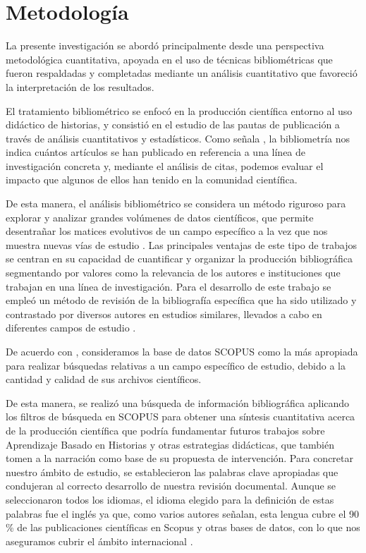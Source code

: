 \section{Metodología}\label{sec-metodología}

La presente investigación se abordó principalmente desde una perspectiva metodológica cuantitativa, apoyada en el uso de técnicas bibliométricas que fueron respaldadas y completadas mediante un análisis cuantitativo que favoreció la interpretación de los resultados.

El tratamiento bibliométrico se enfocó en la producción científica entorno al uso didáctico de historias, y consistió en el estudio de las pautas de publicación a través de análisis cuantitativos y estadísticos. Como señala \cite{mcburney2002what}, la bibliometría nos indica cuántos artículos se han publicado en referencia a una línea de investigación concreta y, mediante el análisis de citas, podemos evaluar el impacto que algunos de ellos han tenido en la comunidad científica.

De esta manera, el análisis bibliométrico se considera un método riguroso para explorar y analizar grandes volúmenes de datos científicos, que permite desentrañar los matices evolutivos de un campo específico a la vez que nos muestra nuevas vías de estudio \cite{donthu2021how}. Las principales ventajas de este tipo de trabajos se centran en su capacidad de cuantificar y organizar la producción bibliográfica segmentando por valores como la relevancia de los autores e instituciones que trabajan en una línea de investigación. Para el desarrollo de este trabajo se empleó un método de revisión de la bibliografía específica que ha sido utilizado y contrastado por diversos autores en estudios similares, llevados a cabo en diferentes campos de estudio \cite{herrera-franco2020research,md2018bibliometric,pham2021bibliometric}.

De acuerdo con \textcite{andalai2010scopus}, consideramos la base de datos SCOPUS como la más apropiada para realizar búsquedas relativas a un campo específico de estudio, debido a la cantidad y calidad de sus archivos científicos. 

De esta manera, se realizó una búsqueda de información bibliográfica aplicando los filtros de búsqueda en SCOPUS para obtener una síntesis cuantitativa acerca de la producción científica que podría fundamentar futuros trabajos sobre Aprendizaje Basado en Historias y otras estrategias didácticas, que también tomen a la narración como base de su propuesta de intervención. Para concretar nuestro ámbito de estudio, se establecieron las palabras clave apropiadas que condujeran al correcto desarrollo de nuestra revisión documental. Aunque se seleccionaron todos los idiomas, el idioma elegido para la definición de estas palabras fue el inglés ya que, como varios autores señalan, esta lengua cubre el 90 \% de las publicaciones científicas en Scopus y otras bases de datos, con lo que nos aseguramos cubrir el ámbito internacional \cite{albarillo2014language,mongeon2016journal}.

